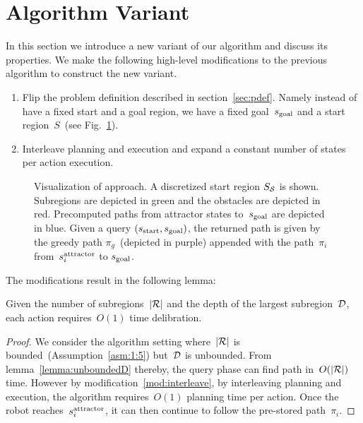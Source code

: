 \documentclass[a4paper]{report}
\begin{document}
\section{Algorithm Variant}
In this section we introduce a new variant of our algorithm and discuss its properties.
We make the following high-level modifications to the previous algorithm to construct the new variant. 

\begin{enumerate}[label={\textbf{M\arabic*}},leftmargin=0.75cm]
\item \label{mod:flip} Flip the problem definition described in section~\ref{sec:pdef}. Namely instead of have a fixed start and a goal region, we have a fixed goal~$s_{\text{goal}}$ and a start region~$S$~(see Fig.~\ref{fig:approach_flip}).
\item \label{mod:interleave} Interleave planning and execution and expand a constant number of states per action execution.
\end{enumerate}

\begin{figure}
\centering
  \caption{
  Visualization of approach. A discretized start region $S_\mathcal{S}$ is shown. Subregions are depicted in green and the  obstacles are depicted in red.
  Precomputed paths from attractor states to~$s_{\text{goal}}$ are depicted in blue.
 Given a query $(s_{\rm{start}}, s_{\rm{goal}})$, the returned path is given by the greedy path $\pi_g$~(depicted in purple) appended with the path~$\pi_i$ from~$s^{\text{attractor}}_i$ to $s_{\text{goal}}$.
}
    \label{fig:approach_flip}
\end{figure}

The modifications result in the following lemma:
\vspace{2mm}
\begin{lemma}
\label{lemma:var:o1}
	Given the number of subregions~$|\mathcal{R}|$ and the depth of the largest subregion~$\mathcal{D}$, each action requires~$O(1)$ time delibration.
\end{lemma}

\begin{proof}
We consider the algorithm setting where~$|\mathcal{R}|$ is bounded~(Assumption~\ref{asm:1:5}) but~$\mathcal{D}$ is unbounded. From lemma~\ref{lemma:unboundedD} thereby, the query phase can find path in~$O(|\mathcal{R}|)$ time.
%
However by modification~\ref{mod:interleave}, by interleaving planning and execution, the algorithm requires~$O(1)$ planning time per action.
Once the robot reaches~$s^{\text{attractor}}_i$, it can then continue to follow the pre-stored path~$\pi_i$. 
\end{proof}
\end{document}
